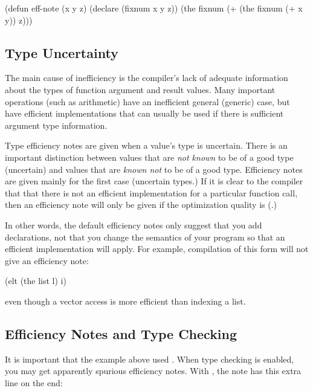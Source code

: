 \begin{lisp}
(defun eff-note (x y z)
  (declare (fixnum x y z))
  (the fixnum (+ (the fixnum (+ x y)) z)))
\end{lisp}


\subsection{Type Uncertainty}

The main cause of inefficiency is the compiler's lack of adequate
information about the types of function argument and result values.
Many important operations (such as arithmetic) have an inefficient
general (generic) case, but have efficient implementations that can
usually be used if there is sufficient argument type information.

Type efficiency notes are given when a value's type is uncertain.
There is an important distinction between values that are {\em not
known} to be of a good type (uncertain) and values that are {\em known
not} to be of a good type. Efficiency notes are given mainly for the
first case (uncertain types.) If it is clear to the compiler that that
there is not an efficient implementation for a particular function
call, then an efficiency note will only be given if the
 optimization quality is 
(.)

In other words, the default efficiency notes only suggest that you add
declarations, not that you change the semantics of your program so
that an efficient implementation will apply.  For example, compilation
of this form will not give an efficiency note:
\begin{lisp}
(elt (the list l) i)
\end{lisp}
even though a vector access is more efficient than indexing a list.


\subsection{Efficiency Notes and Type Checking}

It is important that the  example above used
.  When type checking is enabled, you may get apparently
spurious efficiency notes.  With , the note has this extra
line on the end:

